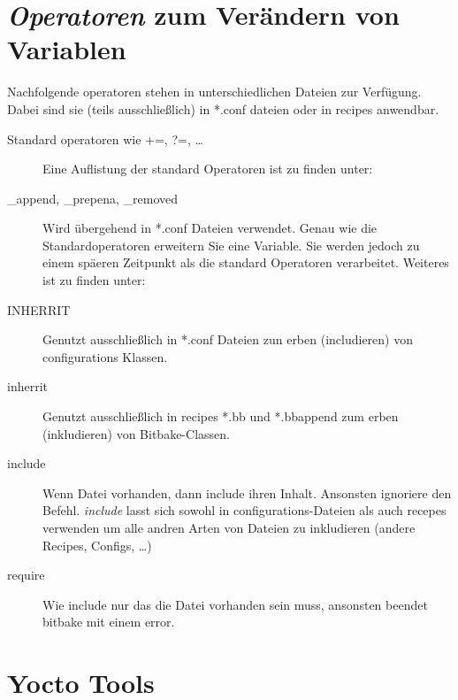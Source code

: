 \section{\textit{Operatoren} zum Verändern von Variablen}
\label{sec:grundlagen_operatoren}

Nachfolgende operatoren stehen in unterschiedlichen Dateien zur Verfügung. Dabei
sind sie (teils ausschließlich) in *.conf dateien oder in recipes anwendbar.

\begin{description}
    \item[Standard operatoren wie +=, ?=, \ldots] Eine Auflistung der standard Operatoren ist zu finden unter:
    \cite[Seite 160]{Gonzalez2018:Embedded_Linux_Development_Using_Yocto_Project_Cookbook_2nd}
    \item[\_append, \_prepena, \_removed] Wird übergehend in *.conf Dateien
        verwendet. Genau wie die Standardoperatoren erweitern Sie eine Variable.
        Sie werden jedoch zu einem späeren Zeitpunkt als die standard Operatoren
        verarbeitet. Weiteres ist zu finden unter:
    \cite[Seite 160]{Gonzalez2018:Embedded_Linux_Development_Using_Yocto_Project_Cookbook_2nd}
    \item[INHERRIT] Genutzt ausschließlich in *.conf Dateien zun erben
        (includieren) von configurations Klassen.
    \item[inherrit] Genutzt ausschließlich in recipes *.bb und *.bbappend zum
        erben (inkludieren) von Bitbake-Classen.
    \item[include] Wenn Datei vorhanden, dann include ihren Inhalt.
        Ansonsten ignoriere den Befehl. \textit{include} lasst sich sowohl in
        configurations-Dateien als auch recepes verwenden um alle andren Arten
        von Dateien zu inkludieren (andere Recipes, Configs, \ldots )
    \item[require] Wie include nur das die Datei vorhanden sein muss, ansonsten
        beendet bitbake mit einem error.
\end{description}






\section{Yocto Tools}%
\label{sec:yocto_tools}

